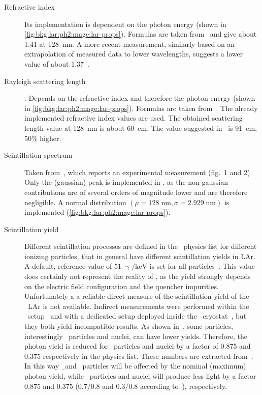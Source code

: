 \begin{description}

  \item[Refractive index] Its implementation is dependent on the photon energy (shown in
    \cref{fig:bkg:lar:ph2:mage:lar-props}). Formulas are taken from~\cite{Bideau-Mehu1981}
    and give about 1.41 at 128~nm. A more recent measurement, similarly based on an
    extrapolation of measured data to lower wavelengths, suggests a lower value of about
    1.37~\cite{Babicz2018}.

  \item[Rayleigh scattering length]. Depends on the refractive index and therefore the
    photon energy (shown in \cref{fig:bkg:lar:ph2:mage:lar-props}). Formulas are taken
    from~\cite{Seidel2002}. The already implemented refractive index values are used. The
    obtained scattering length value at 128~nm is about 60~cm. The value suggested
    in~\cite{Babicz2018} is 91~cm, 50\% higher.

  \item[Scintillation spectrum] Taken from~\cite{Heindl2010}, which reports an
    experimental measurement (fig.~1 and 2). Only the (gaussian) peak is implemented in
    \mage, as the non-gaussian contributions are of several orders of magnitude lower and
    are therefore negligible. A normal distribution $(\mu=128\;\text{nm},
    \sigma=2.929\;\text{nm})$ is implemented (\cref{fig:bkg:lar:ph2:mage:lar-props}).

  \item[Scintillation yield] Different scintillation processes are defined in the \mage\
    physics list for different ionizing particles, that in general have different
    scintillation yields in LAr. A default, reference value of $51\;\upgamma/\text{keV}$
    is set for all particles~\cite{Doke2002}. This value does certainly not represent the
    reality of \gerda, as the yield strongly depends on the electric field configuration
    and the quencher impurities. Unfortunately a a reliable direct measure of the
    scintillation yield of the \gerda\ LAr is not available.  Indirect measurements were
    performed within the \LArGe\ setup~\cite{Lehnert2016} and with a dedicated setup
    deployed inside the \gerda\ cryostat~\cite{Barros2020}, but they both yield
    incompatible results. As shown in~\cite{Doke2002}, some particles, interestingly \a\
    particles and nuclei, can have lower yields. Therefore, the photon yield is reduced
    for \a\ particles and nuclei by a factor of 0.875 and 0.375 respectively in the
    physics list. These numbers are extracted from~\cite{Doke2002}. In this way \b\ and
    \g\ particles will be affected by the nominal (maximum) photon yield, while \a\
    particles and nuclei will produce less light by a factor 0.875 and 0.375 (0.7/0.8 and
    0.3/0.8 according to~\cite{Doke2002}), respectively.


\end{description}
